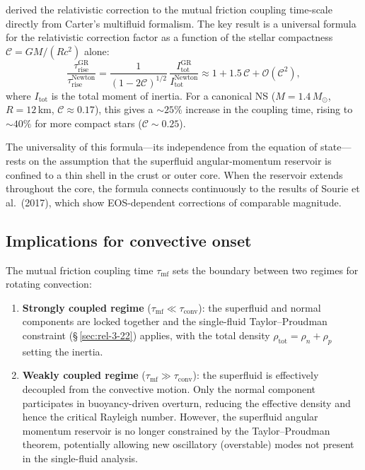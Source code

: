\citet{GavassinoAntonelliPizzocheroHaskell2020} derived the relativistic
correction to the mutual friction coupling time-scale directly from
Carter's multifluid formalism.  The key result is a universal formula
for the relativistic correction factor as a function of the stellar
compactness $\mathcal{C} = GM/(Rc^{2})$ alone:
\begin{equation}
\label{eq:rel-3-trise}
\frac{\tau_{\mathrm{rise}}^{\mathrm{GR}}}
     {\tau_{\mathrm{rise}}^{\mathrm{Newton}}}
= \frac{1}{(1-2\mathcal{C})^{1/2}}\,
  \frac{I_{\mathrm{tot}}^{\mathrm{GR}}}{I_{\mathrm{tot}}^{\mathrm{Newton}}}
  \approx 1 + 1.5\,\mathcal{C} + \mathcal{O}(\mathcal{C}^{2}),
\end{equation}
where $I_{\mathrm{tot}}$ is the total moment of inertia.  For a
canonical NS ($M = 1.4\,M_{\odot}$, $R = 12\,$km,
$\mathcal{C}\approx 0.17$), this gives a $\sim 25\%$ increase in the
coupling time, rising to $\sim 40\%$ for more compact stars
($\mathcal{C}\sim 0.25$).

The universality of this formula---its independence from the equation of
state---rests on the assumption that the superfluid angular-momentum
reservoir is confined to a thin shell in the crust or outer core.  When
the reservoir extends throughout the core, the formula connects
continuously to the results of Sourie et al.\ (2017), which show
EOS-dependent corrections of comparable magnitude.

\subsection{Implications for convective onset}
\label{sec:rel-3-convection-superfluid}

The mutual friction coupling time $\tau_{\mathrm{mf}}$ sets the
boundary between two regimes for rotating convection:
\begin{enumerate}
\item \textbf{Strongly coupled regime}
  ($\tau_{\mathrm{mf}} \ll \tau_{\mathrm{conv}}$):
  the superfluid and normal components are locked together and the
  single-fluid Taylor--Proudman constraint (\S\,\ref{sec:rel-3-22})
  applies, with the total density $\rho_{\mathrm{tot}} = \rho_{n} + \rho_{p}$
  setting the inertia.

\item \textbf{Weakly coupled regime}
  ($\tau_{\mathrm{mf}} \gg \tau_{\mathrm{conv}}$):
  the superfluid is effectively decoupled from the convective motion.
  Only the normal component participates in buoyancy-driven overturn,
  reducing the effective density and hence the critical Rayleigh
  number.  However, the superfluid angular momentum reservoir is no
  longer constrained by the Taylor--Proudman theorem, potentially
  allowing new oscillatory (overstable) modes not present in the
  single-fluid analysis.
\end{enumerate}

